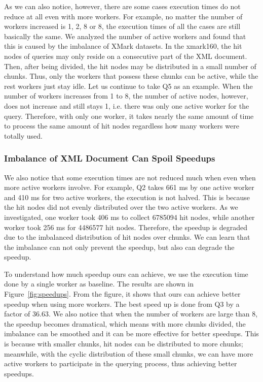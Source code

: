 As we can also notice, however, there are some cases execution times do not
reduce at all even with more workers. For example, no matter the number of
workers increased is 1, 2, 8 or 8, the execution times of all the cases are
still basically the same.  We analyzed the number of active workers and found
that this is caused by the imbalance of XMark datasets. In the xmark160, the hit
nodes of queries may only reside on a consecutive part of the XML document.
Then, after being divided, the hit nodes may be distributed in a small number of
chunks. Thus, only the workers that possess these chunks can be active, while
the rest workers just stay idle. Let us continue to take Q5 as an example. When
the number of workers increases from 1 to 8, the number of active nodes,
however, does not increase and still stays 1, i.e. there was only one active
worker for the query. Therefore, with only one worker, it takes nearly the same
amount of time to process the same amount of hit nodes regardless how many
workers were totally used. 

\subsubsection{Imbalance of XML Document Can Spoil Speedups}

We also notice that some execution times are not reduced much when even when
more active workers involve. For example, Q2 takes 661 ms by one active worker
and 410 ms for two active workers, the execution is not halved. This is because
the hit nodes did not evenly distributed over the two active workers. As we
investigated, one worker took 406 ms to collect 6785094 hit nodes, while another
worker took 256 ms for 4486577 hit nodes. Therefore, the speedup is degraded due
to the imbalanced distribution of hit nodes over chunks. We can learn that the
imbalance can not only prevent the speedup, but also can degrade the speedup.

To understand how much speedup ours can achieve, we use the execution time done
by a single worker as baseline. The results are shown in
Figure~\ref{fig:speedups}.  From the figure, it shows that ours can achieve
better speedup when using more workers. The best speed up is done from Q3 by a
factor of 36.63. We also notice that when the number of workers are large than
8, the speedup becomes dramatical, which means with more chunks divided, the
imbalance can be smoothed and it can be more effective for better speedups. This
is because  with smaller chunks, hit nodes can be distributed to more chunks;
meanwhile,  with the cyclic distribution of these small chunks, we can have more
active workers to participate in the querying process, thus achieving better
speedups. 


